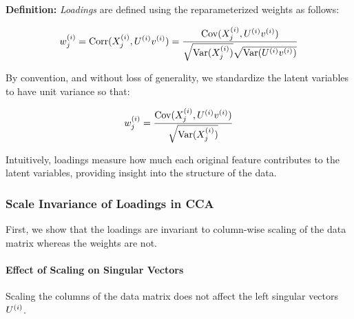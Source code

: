 \textbf{Definition:} \textit{Loadings} are defined using the reparameterized weights as follows:

\begin{align}
    w^{(i)}_j = \operatorname{Corr}(X^{(i)}_j, U^{(i)}v^{(i)}) = \frac{\mathrm{Cov}(X^{(i)}_j, U^{(i)}v^{(i)})}{\sqrt{\mathrm{Var}(X^{(i)}_j)}\sqrt{\mathrm{Var}(U^{(i)}v^{(i)})}} \label{eq:loading_def}
\end{align}

By convention, and without loss of generality, we standardize the latent variables to have unit variance so that:

\begin{align}
    w^{(i)}_j = \frac{\mathrm{Cov}(X^{(i)}_j, U^{(i)}v^{(i)})}{\sqrt{\mathrm{Var}(X^{(i)}_j)}} \label{eq:standardized_loading}
\end{align}

Intuitively, \gls{loadings} measure how much each original feature contributes to the latent variables, providing insight into the structure of the data.

\subsubsection{Scale Invariance of Loadings in CCA}

First, we show that the \gls{loadings} are invariant to column-wise scaling of the data matrix whereas the weights are not.

\paragraph{Effect of Scaling on Singular Vectors}

\begin{lemma}
    Scaling the columns of the data matrix does not affect the left singular vectors $U^{(i)}$.
\end{lemma}

